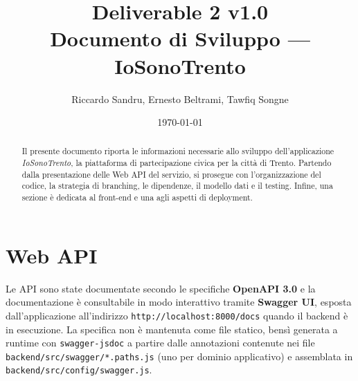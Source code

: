 \documentclass{article}
\title{Deliverable 2 v1.0 \\ \large Documento di Sviluppo --- IoSonoTrento}
\author{Riccardo Sandru, Ernesto Beltrami, Tawfiq Songne}
\date{\today}
\newcommand{\code}[1]{\texttt{\small #1}}
\begin{document}
\maketitle

\begin{abstract}
	Il presente documento riporta le informazioni necessarie allo sviluppo dell'applicazione
	\textit{IoSonoTrento}, la piattaforma di partecipazione civica per la città di Trento.
	Partendo dalla presentazione delle Web API del servizio, si prosegue con l'organizzazione
	del codice, la strategia di branching, le dipendenze, il modello dati e il testing.
	Infine, una sezione è dedicata al front-end e una agli aspetti di deployment.
\end{abstract}

\setcounter{tocdepth}{2}
\tableofcontents
\newpage

\section{Web API}

Le API sono state documentate secondo le specifiche \textbf{OpenAPI 3.0} e la documentazione
è consultabile in modo interattivo tramite \textbf{Swagger UI}, esposta dall'applicazione
all'indirizzo \code{http://localhost:8000/docs} quando il backend è in esecuzione.
La specifica non è mantenuta come file statico, bensì generata a runtime con
\code{swagger-jsdoc} a partire dalle annotazioni contenute nei file
\code{backend/src/swagger/*.paths.js} (uno per dominio applicativo) e assemblata in
\code{backend/src/config/swagger.js}.
\end{document}
